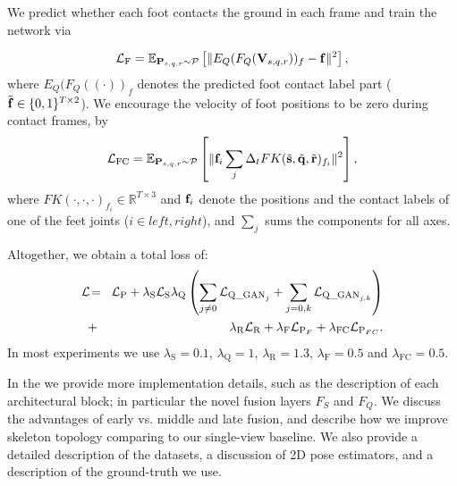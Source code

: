 We predict whether each foot contacts the ground in each frame and train the network via

\setlength{\abovedisplayskip}{-2pt plus 2pt minus 2pt}
\setlength{\belowdisplayskip}{7pt plus 2pt minus 2pt}

\begin{align}
\mathcal{L}_{\text{F}} = \mathbb{E}_{{\bf P}_{s,q,r}\sim \mathcal{P}}\left[ \Vert E_Q(F_Q({\bf V}_{s,q,r}))_f - {\bf f}\Vert^2 \right],
\end{align}
where $E_Q(F_Q((\cdot))_f$ denotes the predicted foot contact label part ($\tilde{{\bf f}}\in\{0,1\}^{T\times 2}$).
We encourage the velocity of foot positions to be zero during contact frames, by
\begin{align}
\mathcal{L}_{\text{FC}} = \mathbb{E}_{{\bf P}_{s,q,r}\sim \mathcal{P}}\left[ \Vert {\bf f}_i \sum_j \Delta_t FK(\tilde{{\bf s}}, \tilde{{\bf q}}, \tilde{{\bf r}})_{f_i} \Vert^2 \right],
\end{align}
where $FK(\cdot,\cdot,\cdot)_{f_i}\in\mathbb{R}^{T\times 3}$ and ${\bf f}_i$ denote the positions and the contact labels of one of the feet joints ($i\in \mathit{left}, \mathit{right}$), and $\sum_j$ sums the components for all axes.

Altogether, we obtain a total loss of:
\begin{eqnarray}
\Loss \!&=\!& \Loss_{\text{P}} +
\lambda_{\text{S}} \Loss_{\text{S}}
%
\lambda_{\text{Q}} \left(
\sum_{j\ne 0}\Loss_{{\text{Q\_GAN}}_j} +
\sum_{j=0,k}\Loss_{{\text{Q\_GAN}}_{j,k}}
\right) \\ \nonumber \!&+\!&
%
\lambda_{\text{R}}\Loss_{\text{R}} +
\lambda_{\text{F}}\Loss_{\text{P}_{F}} +
\lambda_{\text{FC}}\Loss_{\text{P}_{FC}}.
\end{eqnarray}
In most experiments we use $\lambda_{\text{S}}=0.1$, $\lambda_{\text{Q}}=1$, %
$\lambda_{\text{R}}=1.3$,  $\lambda_{\text{F}}=0.5$ and $\lambda_{\text{FC}}=0.5$. 

In the \fi we provide more implementation details, such as the description of each architectural block; in particular the novel fusion layers $F_S$ and $F_Q$. We discuss the advantages of early vs. middle and late fusion, and describe how we improve skeleton topology comparing to our single-view baseline. We also provide a detailed description of the datasets, a discussion of 2D pose estimators, and a description of the ground-truth we use.